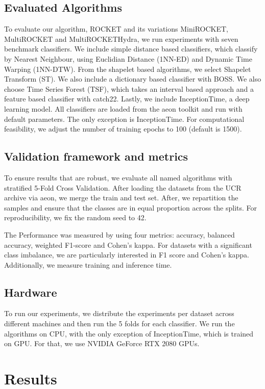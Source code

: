 \documentclass[conference]{IEEEtran}
\begin{document}



\subsection{Evaluated Algorithms}
To evaluate our algorithm, ROCKET and its variations MiniROCKET, MultiROCKET and MultiROCKETHydra, we run experiments with seven benchmark classifiers. We include simple distance based classifiers, which classify by Nearest Neighbour, using Euclidian Distance (1NN-ED) and Dynamic Time Warping (1NN-DTW). From the shapelet based algorithms, we select Shapelet Transform (ST). We also include a dictionary based classifier with BOSS. We also choose Time Series Forest (TSF), which takes an interval based approach and a feature based classifier with catch22. Lastly, we include InceptionTime, a deep learning model. All classifiers are loaded from the aeon toolkit and run with default parameters. The only exception is InceptionTime. For computational feasibility, we adjust the number of training epochs to 100 (default is 1500). 

\subsection{Validation framework and metrics}
To ensure results that are robust, we evaluate all named algorithms with stratified 5-Fold Cross Validation. After loading the datasets from the UCR archive via aeon, we merge the train and test set. After, we repartition the samples and ensure that the classes are in equal proportion across the splits. For reproducibility, we fix the random seed to 42. 

The Performance was measured by using four metrics: accuracy, balanced accuracy, weighted F1-score and Cohen’s kappa. For datasets with a significant class imbalance, we are particularly interested in F1 score and Cohen's kappa. Additionally, we measure training and inference time. 

\subsection{Hardware}
To run our experiments, we distribute the experiments per dataset across different machines and then run the 5 folds for each classifier. We run the algorithms on CPU, with the only exception of InceptionTime, which is trained on GPU. For that, we use NVIDIA GeForce RTX 2080 GPUs. 

\section{Results}
\end{document}
